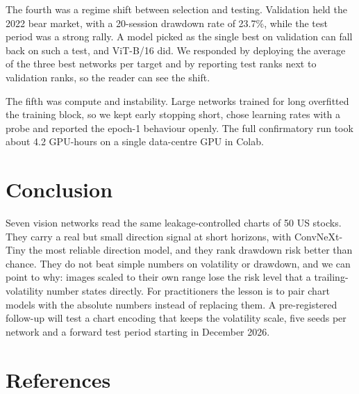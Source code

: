 \documentclass[11pt,a4paper]{article}
\begin{document}
The fourth was a regime shift between selection and testing. Validation held the 2022 bear market, with a 20-session drawdown rate of 23.7\%, while the test period was a strong rally. A model picked as the single best on validation can fall back on such a test, and ViT-B/16 did. We responded by deploying the average of the three best networks per target and by reporting test ranks next to validation ranks, so the reader can see the shift.

The fifth was compute and instability. Large networks trained for long overfitted the training block, so we kept early stopping short, chose learning rates with a probe and reported the epoch-1 behaviour openly. The full confirmatory run took about 4.2 GPU-hours on a single data-centre GPU in Colab.

\section{Conclusion}

Seven vision networks read the same leakage-controlled charts of 50 US stocks. They carry a real but small direction signal at short horizons, with ConvNeXt-Tiny the most reliable direction model, and they rank drawdown risk better than chance. They do not beat simple numbers on volatility or drawdown, and we can point to why: images scaled to their own range lose the risk level that a trailing-volatility number states directly. For practitioners the lesson is to pair chart models with the absolute numbers instead of replacing them. A pre-registered follow-up will test a chart encoding that keeps the volatility scale, five seeds per network and a forward test period starting in December 2026.

\section{References}
\end{document}
